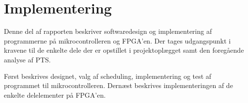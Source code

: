 \part{Implementering}
Denne del af rapporten beskriver softwaredesign og implementering af programmerne
på mikrocontrolleren og FPGA'en.
Der tages udgangspunkt i kravene til de enkelte dele der er opstillet i projektoplægget samt den foregående analyse af PTS.

Først beskrives designet, valg af scheduling,
implementering og test af programmet til mikrocontrolleren.
Dernæst beskrives implementeringen af de enkelte delelementer på FPGA'en.


%
